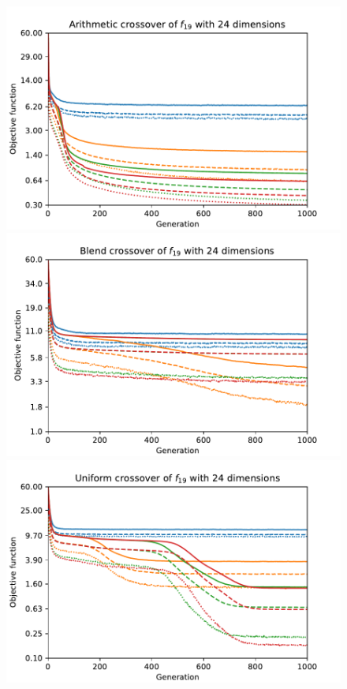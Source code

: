 \begin{figure}[ht!]
    \begin{minipage}[t]{0.32\textwidth}
        \centering
        \includegraphics[width=\textwidth]{img/runs/fitness_es_crossover_f19_dim24_Arithmetic.pdf}
    \end{minipage}
    \hfill
    \begin{minipage}[t]{0.32\textwidth}
        \centering
        \includegraphics[width=\textwidth]{img/runs/fitness_es_crossover_f19_dim24_Blend.pdf}
    \end{minipage}
    \hfill
    \begin{minipage}[t]{0.32\textwidth}
        \centering
        \includegraphics[width=\textwidth]{img/runs/fitness_es_crossover_f19_dim24_Uniform.pdf}

\end{minipage}
\end{figure}
